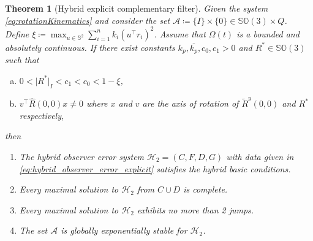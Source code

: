 \documentclass{article}
\newcommand{\SOthree}{\mathbb{SO}(3)}
\newtheorem{theorem}{Theorem}
\newcommand{\brackets}[1]{\left(#1\right)}
\newcommand{\Rtilde}{\tilde{R}}
\newcommand{\normSOthree}[1]{{{\vert}#1 {\vert}_I}}
\newcommand{\Rstar}{{R^*}}
\begin{document}
\begin{theorem}[Hybrid explicit complementary filter]\label{theorem:hybridECF}
Given the system \eqref{eq:rotationKinematics} and consider the set $\mathcal{A}\coloneqq \{I\}\times \{0\}\in\SOthree\times Q$. Define $\xi\coloneqq \max_{u\in\mathbb{S}^2}\sum_{i=1}^nk_i(u^\top r_i)^2$. Assume that $\Omega(t)$ is a bounded and absolutely continuous. If there exist constants $k_p, \overline{k_p}, c_0, c_1 > 0$ and $\Rstar\in\SOthree$ such that

\begin{enumerate}[(a)]
        \item $0 < \normSOthree{\Rstar} < c_1 < c_0 < 1-\xi$,\label{item:a-bullet-ecf}\\
        \item {${v}^\top \hat{R}(0,0)x\neq 0$ where $x$ and $v$ are the axis of rotation of $\Rtilde^y(0,0)$ and $R^*$ respectively}, \label{item:b-bullet-ecf}
\end{enumerate}
then
\begingroup
    \renewcommand\labelenumi{(\theenumi)}
    \begin{enumerate}
        \item \label{(1ecf)}The hybrid observer error system $\mathcal{H}_2 = (C, F, D, G)$ with data given in \eqref{eq:hybrid_observer_error_explicit} satisfies the hybrid basic conditions.
        \item \label{(2ecf)}Every maximal solution to $\mathcal{H}_2$ from $C\cup D$ is complete.
        \item \label{(3ecf)} Every maximal solution to $\mathcal{H}_2$ exhibits no more than 2 jumps. 
        \item \label{(4ecf)}The set $\mathcal{A}$ is globally exponentially stable for $\mathcal{H}_2$. 
    \end{enumerate}
    \endgroup
\end{theorem}
\end{document}
